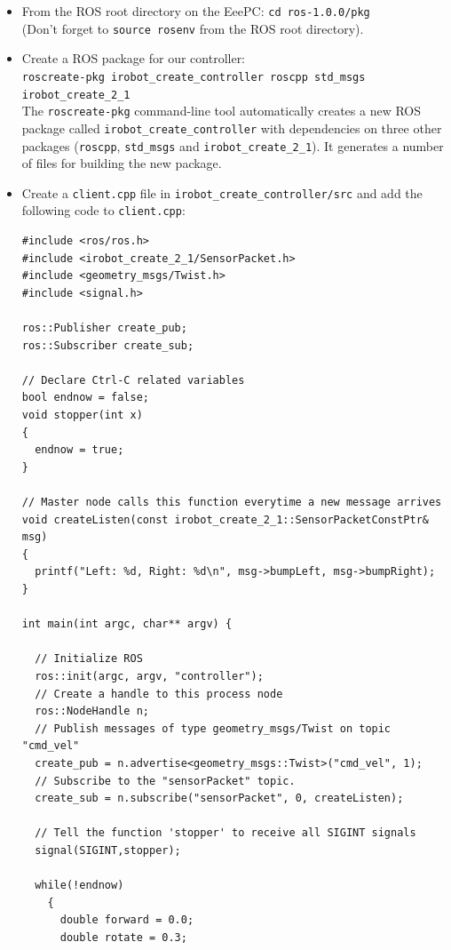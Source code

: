 \begin{itemize}

\item From the ROS root directory on the EeePC: \texttt{cd ros-1.0.0/pkg}\\
(Don't forget to \texttt{source rosenv} from the ROS root directory).

\item Create a ROS package for our controller:\\
\texttt{roscreate-pkg irobot\_create\_controller roscpp std\_msgs irobot\_create\_2\_1}\\
The \texttt{roscreate-pkg} command-line tool automatically creates a new ROS package called \texttt{irobot\_create\_controller} with dependencies on three other packages (\texttt{roscpp}, \texttt{std\_msgs} and \texttt{irobot\_create\_2\_1}). It generates a number of files for building the new package.

\item Create a \texttt{client.cpp} file in \texttt{irobot\_create\_controller/src} and add the following code to \texttt{client.cpp}:

\begin{verbatim}
#include <ros/ros.h>
#include <irobot_create_2_1/SensorPacket.h>
#include <geometry_msgs/Twist.h>
#include <signal.h>

ros::Publisher create_pub;
ros::Subscriber create_sub;

// Declare Ctrl-C related variables
bool endnow = false;
void stopper(int x)
{
  endnow = true;
}

// Master node calls this function everytime a new message arrives
void createListen(const irobot_create_2_1::SensorPacketConstPtr& msg)
{
  printf("Left: %d, Right: %d\n", msg->bumpLeft, msg->bumpRight);  
}

int main(int argc, char** argv) {

  // Initialize ROS
  ros::init(argc, argv, "controller");
  // Create a handle to this process node
  ros::NodeHandle n;
  // Publish messages of type geometry_msgs/Twist on topic "cmd_vel"
  create_pub = n.advertise<geometry_msgs::Twist>("cmd_vel", 1);
  // Subscribe to the "sensorPacket" topic.
  create_sub = n.subscribe("sensorPacket", 0, createListen);

  // Tell the function 'stopper' to receive all SIGINT signals	
  signal(SIGINT,stopper);

  while(!endnow)
    {
      double forward = 0.0;
      double rotate = 0.3;


\end{verbatim}
\end{itemize}
